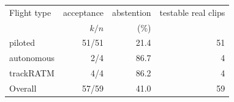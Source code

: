 \begin{tabular}{lrrr}
\toprule
Flight type & acceptance & abstention & testable real clips \\
 & $k/n$ & (\%) & \\
\midrule
piloted & 51/51 & 21.4 & 51 \\
autonomous & 2/4 & 86.7 & 4 \\
trackRATM & 4/4 & 86.2 & 4 \\
Overall & 57/59 & 41.0 & 59 \\
\bottomrule
\end{tabular}
